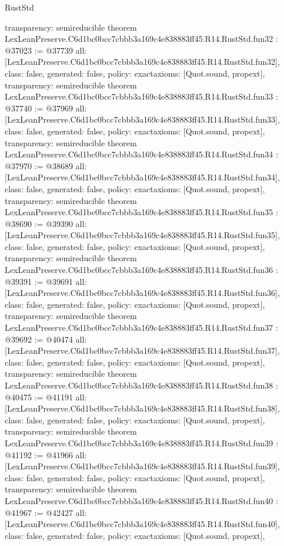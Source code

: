 \begin{lexlean}{RustStd}
\begin{coremodule}
{  transparency: semireducible
}
theorem LexLeanPreserve.C6d1bc0bcc7cbbb3a169c4e838883ff45.R14.RustStd.fun32 : @37023 := @37739 {
  all: [LexLeanPreserve.C6d1bc0bcc7cbbb3a169c4e838883ff45.R14.RustStd.fun32],
  class: false,
  generated: false,
  policy: exact{axioms: [Quot.sound, propext]},
  transparency: semireducible
}
theorem LexLeanPreserve.C6d1bc0bcc7cbbb3a169c4e838883ff45.R14.RustStd.fun33 : @37740 := @37969 {
  all: [LexLeanPreserve.C6d1bc0bcc7cbbb3a169c4e838883ff45.R14.RustStd.fun33],
  class: false,
  generated: false,
  policy: exact{axioms: [Quot.sound, propext]},
  transparency: semireducible
}
theorem LexLeanPreserve.C6d1bc0bcc7cbbb3a169c4e838883ff45.R14.RustStd.fun34 : @37970 := @38689 {
  all: [LexLeanPreserve.C6d1bc0bcc7cbbb3a169c4e838883ff45.R14.RustStd.fun34],
  class: false,
  generated: false,
  policy: exact{axioms: [Quot.sound, propext]},
  transparency: semireducible
}
theorem LexLeanPreserve.C6d1bc0bcc7cbbb3a169c4e838883ff45.R14.RustStd.fun35 : @38690 := @39390 {
  all: [LexLeanPreserve.C6d1bc0bcc7cbbb3a169c4e838883ff45.R14.RustStd.fun35],
  class: false,
  generated: false,
  policy: exact{axioms: [Quot.sound, propext]},
  transparency: semireducible
}
theorem LexLeanPreserve.C6d1bc0bcc7cbbb3a169c4e838883ff45.R14.RustStd.fun36 : @39391 := @39691 {
  all: [LexLeanPreserve.C6d1bc0bcc7cbbb3a169c4e838883ff45.R14.RustStd.fun36],
  class: false,
  generated: false,
  policy: exact{axioms: [Quot.sound, propext]},
  transparency: semireducible
}
theorem LexLeanPreserve.C6d1bc0bcc7cbbb3a169c4e838883ff45.R14.RustStd.fun37 : @39692 := @40474 {
  all: [LexLeanPreserve.C6d1bc0bcc7cbbb3a169c4e838883ff45.R14.RustStd.fun37],
  class: false,
  generated: false,
  policy: exact{axioms: [Quot.sound, propext]},
  transparency: semireducible
}
theorem LexLeanPreserve.C6d1bc0bcc7cbbb3a169c4e838883ff45.R14.RustStd.fun38 : @40475 := @41191 {
  all: [LexLeanPreserve.C6d1bc0bcc7cbbb3a169c4e838883ff45.R14.RustStd.fun38],
  class: false,
  generated: false,
  policy: exact{axioms: [Quot.sound, propext]},
  transparency: semireducible
}
theorem LexLeanPreserve.C6d1bc0bcc7cbbb3a169c4e838883ff45.R14.RustStd.fun39 : @41192 := @41966 {
  all: [LexLeanPreserve.C6d1bc0bcc7cbbb3a169c4e838883ff45.R14.RustStd.fun39],
  class: false,
  generated: false,
  policy: exact{axioms: [Quot.sound, propext]},
  transparency: semireducible
}
theorem LexLeanPreserve.C6d1bc0bcc7cbbb3a169c4e838883ff45.R14.RustStd.fun40 : @41967 := @42427 {
  all: [LexLeanPreserve.C6d1bc0bcc7cbbb3a169c4e838883ff45.R14.RustStd.fun40],
  class: false,
  generated: false,
  policy: exact{axioms: [Quot.sound, propext]},
}
\end{coremodule}
\end{lexlean}
